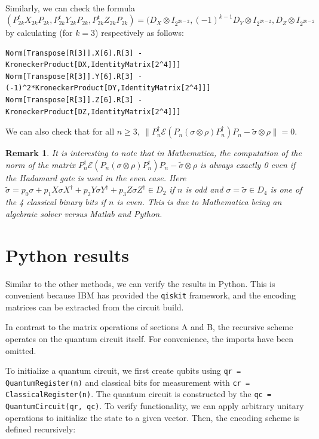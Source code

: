 \documentclass[11pt]{article}
\newtheorem{remark}[theorem]{Remark}
\def\cE{{\mathcal E}}
\begin{document}
\noindent Similarly, we can check the formula
$$(P_{2k}^t X_{2k}P_{2k}, P_{2k}^t Y_{2k}P_{2k}, 
P_{2k}^t Z_{2k}P_{2k}) 
= 
 (D_X \otimes I_{2^{2k-2}}, (-1)^{k-1}D_Y \otimes I_{2^{2k-2}}, 
 D_Z \otimes I_{2^{2k-2}} $$
by calculating (for $k=3$) respectively as follows:
\begin{verbatim}
Norm[Transpose[R[3]].X[6].R[3] - KroneckerProduct[DX,IdentityMatrix[2^4]]]
Norm[Transpose[R[3]].Y[6].R[3] - (-1)^2*KroneckerProduct[DY,IdentityMatrix[2^4]]]
Norm[Transpose[R[3]].Z[6].R[3] - KroneckerProduct[DZ,IdentityMatrix[2^4]]]
\end{verbatim}

\noindent We can also check that for all $n\ge 3,\ \|P_n^\dag \cE( P_n (\sigma \otimes \rho) P_n^\dag) P_n  
-\tilde \sigma \otimes \rho\|=0$.

\begin{remark} \rm It is interesting to note that in Mathematica,
the computation of the norm of the matrix 
$P_n^\dag \cE( P_n (\sigma \otimes \rho) P_n^\dag) P_n  
-\tilde \sigma \otimes \rho$ is always exactly 0 even if the Hadamard
gate is used in the even case.
Here $\tilde \sigma  = p_0 \sigma + p_1 X\sigma X^\dag + p_2 Y \sigma Y^\dag 
+ p_3 Z \sigma Z^\dag \in D_2$ if $n$ is odd and 
$\sigma = \tilde \sigma \in D_4$ is one of the 4 classical binary bits if 
$n$ is even. This is due to Mathematica being an algebraic solver versus Matlab and Python.
\end{remark}

\section{Python results}
Similar to the other methods, we can verify the results in Python. 
This is convenient because IBM has provided the \verb|qiskit| framework, and the encoding matrices
can be extracted from the circuit build.

In contrast to the matrix operations of sections A and B, the recursive scheme operates on the quantum circuit itself. For convenience, the imports have been omitted. 

To initialize a quantum circuit, we first create qubits using \verb|qr = QuantumRegister(n)| and classical bits for measurement with \verb|cr = ClassicalRegister(n)|. The quantum circuit is constructed by the \verb|qc = QuantumCircuit(qr, qc)|. To verify functionality, we can apply arbitrary unitary operations to initialize the state to a given vector. Then, the encoding scheme is defined recursively:
\end{document}
